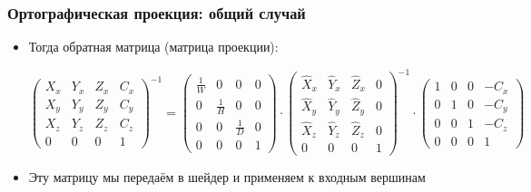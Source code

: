 \documentclass[10pt]{beamer}
\begin{document}
\begin{frame}[fragile]
\frametitle{Ортографическая проекция: общий случай}
\begin{itemize}
\item Тогда обратная матрица (матрица проекции):
\begin{center}
\begin{math}
\begin{pmatrix}
X_x & Y_x & Z_x & C_x \\
X_y & Y_y & Z_y & C_y \\
X_z & Y_z & Z_z & C_z \\
0 & 0 & 0 & 1
\end{pmatrix}^{-1}
=
\begin{pmatrix}
\frac{1}{W} & 0 & 0 & 0 \\
0 & \frac{1}{H} & 0 & 0 \\
0 & 0 & \frac{1}{D} & 0 \\
0 & 0 & 0 & 1
\end{pmatrix}
\cdot
\begin{pmatrix}
\hat X_x & \hat Y_x & \hat Z_x & 0 \\
\hat X_y & \hat Y_y & \hat Z_y & 0 \\
\hat X_z & \hat Y_z & \hat Z_z & 0 \\
0 & 0 & 0 & 1
\end{pmatrix}^{-1}
\cdot
\begin{pmatrix}
1 & 0 & 0 & -C_x \\
0 & 1 & 0 & -C_y \\
0 & 0 & 1 & -C_z \\
0 & 0 & 0 & 1
\end{pmatrix}
\end{math}
\end{center}
\pause
\item Эту матрицу мы передаём в шейдер и применяем к входным вершинам
\end{itemize}
\end{frame}
\end{document}

